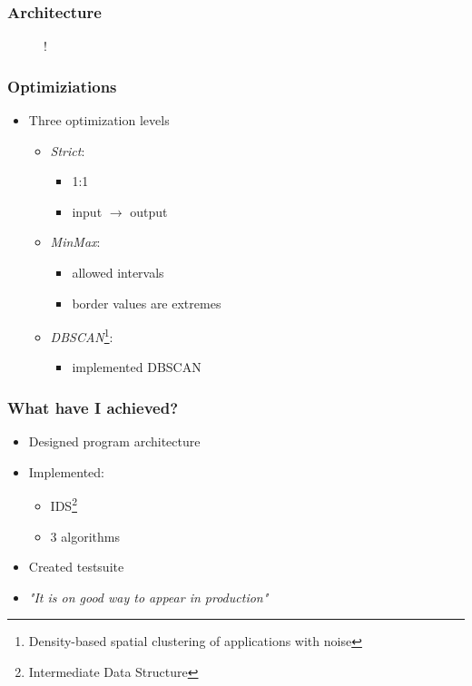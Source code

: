 \documentclass[10pt,xcolor=pdflatex]{beamer}
\begin{document}
\begin{frame}\frametitle{Architecture}
  \begin{figure}[h]
  \centering
  \resizebox {\textwidth} {!} {
    
  }
  \label{fig:tikz:architecture}
\end{figure}
\end{frame}

\begin{frame}\frametitle{Optimiziations}

  \begin{itemize}
    \item Three optimization levels
     \begin{itemize}
	    \item \emph{Strict}:
	    \begin{itemize}
	      \item 1:1
	      \item input $\rightarrow$ output
	    \end{itemize}
	    \item \emph{MinMax}:
	    \begin{itemize}
	      \item allowed intervals
	      \item border values are extremes
	    \end{itemize}
	    \item \emph{DBSCAN}\footnote{Density-based spatial clustering of applications with noise}:
	    \begin{itemize}
	      \item implemented DBSCAN\cite{Mahesh_Kumar2016, Schubert:2017:DRR:3129336.3068335}
	    \end{itemize}
	  \end{itemize}
  \end{itemize}

 
\end{frame}

\begin{frame}\frametitle{What have I achieved?}
    \begin{itemize}
    	\item Designed program architecture
    	\item Implemented:
    	\begin{itemize}
    		\item IDS\footnote{Intermediate Data Structure}
    		\item 3 algorithms
    	\end{itemize}
    	\item Created testsuite
    	\item \textit{"It is on good way to appear in production"}
    \end{itemize}
\end{frame}
\end{document}

